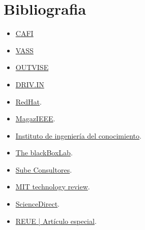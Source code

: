 \documentclass[12pt]{article}
\begin{document}
\clearpage

\section{Bibliografia}
\begin{itemize}
    \item \href{https://www.cafi.org.ar/como-se-aplica-la-ia-en-la-agricultura-y-algunos-ejemplos/}{CAFI}
    \item \href{https://vasscompany.com/es/insights/blogs-articles/ia-en-banca-beneficios-y-riesgos/}{VASS}
    \item \href{https://blog.outvise.com/impacto-de-inteligencia-artificial-en-ciberseguridad/}{OUTVISE}
    \item \href{https://driv.in/blog/beneficios-de-ia-logistica}{DRIV.IN}
    \item \href{https://www.redhat.com/es/topics/hyperconverged-infrastructure/what-is-software-defined-networking}{RedHat}.
    \item \href{https://r9.ieee.org/ecuador-magaz/rendimiento-y-modelamiento-de-sistemas-de-comunicacion-inalambrica-5g%E2%80%8B/}{MagazIEEE}.
    \item \href{https://www.iic.uam.es/innovacion/alphazero-y-el-go/}{Instituto de ingeniería del conocimiento}.
    \item \href{https://theblackboxlab.com/2024/02/23/deepmind/}{The blackBoxLab}.
    \item \href{https://www.linkedin.com/pulse/creatividad-artificial-est%C3%A1-la-ia-redefiniendo-el-concepto-e0djc/}{Sube Consultores}.
    \item \href{https://www.technologyreview.es/s/16532/que-es-la-inteligencia-artificial}{MIT technology review}.
    \item \href{https://www.sciencedirect.com/science/article/pii/S1136103423000114}{ScienceDirect}.
    \item \href{chrome-extension://efaidnbmnnnibpcajpcglclefindmkaj/https://www.reue.org/wp-content/uploads/2024/07/184-195.pdf}{REUE | Artículo especial}.


\end{itemize}
\end{document}
